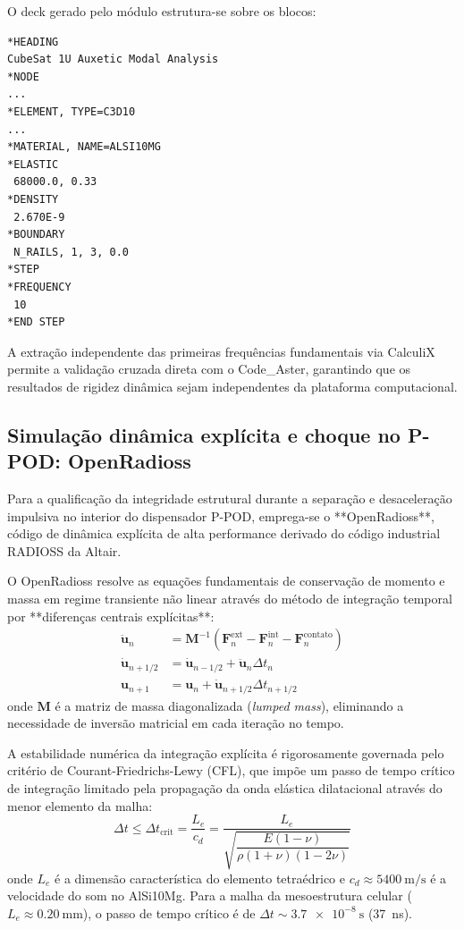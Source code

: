 O deck gerado pelo módulo  estrutura-se sobre os blocos:
\begin{verbatim}
*HEADING
CubeSat 1U Auxetic Modal Analysis
*NODE
...
*ELEMENT, TYPE=C3D10
...
*MATERIAL, NAME=ALSI10MG
*ELASTIC
 68000.0, 0.33
*DENSITY
 2.670E-9
*BOUNDARY
 N_RAILS, 1, 3, 0.0
*STEP
*FREQUENCY
 10
*END STEP
\end{verbatim}
A extração independente das primeiras frequências fundamentais via CalculiX permite a validação cruzada direta com o Code\_Aster, garantindo que os resultados de rigidez dinâmica sejam independentes da plataforma computacional.

\subsection{Simulação dinâmica explícita e choque no P-POD: OpenRadioss}
\label{subsec:openradioss-stack}

Para a qualificação da integridade estrutural durante a separação e desaceleração impulsiva no interior do dispensador P-POD, emprega-se o **OpenRadioss**, código de dinâmica explícita de alta performance derivado do código industrial RADIOSS da Altair.

O OpenRadioss resolve as equações fundamentais de conservação de momento e massa em regime transiente não linear através do método de integração temporal por **diferenças centrais explícitas**:
\begin{align}
  \ddot{\mathbf{u}}_n &= \mathbf{M}^{-1} \left( \mathbf{F}_n^{\text{ext}} - \mathbf{F}_n^{\text{int}} - \mathbf{F}_n^{\text{contato}} \right) \label{eq:radioss-acel} \\
  \dot{\mathbf{u}}_{n+1/2} &= \dot{\mathbf{u}}_{n-1/2} + \ddot{\mathbf{u}}_n \Delta t_n \label{eq:radioss-vel} \\
  \mathbf{u}_{n+1} &= \mathbf{u}_n + \dot{\mathbf{u}}_{n+1/2} \Delta t_{n+1/2} \label{eq:radioss-desloc}
\end{align}
onde $\mathbf{M}$ é a matriz de massa diagonalizada (\textit{lumped mass}), eliminando a necessidade de inversão matricial em cada iteração no tempo.

A estabilidade numérica da integração explícita é rigorosamente governada pelo critério de Courant-Friedrichs-Lewy (CFL), que impõe um passo de tempo crítico de integração limitado pela propagação da onda elástica dilatacional através do menor elemento da malha:
\begin{equation}
  \Delta t \le \Delta t_{\text{crit}} = \frac{L_e}{c_d} = \frac{L_e}{\sqrt{\dfrac{E(1-\nu)}{\rho(1+\nu)(1-2\nu)}}}
  \label{eq:cfl-teoria}
\end{equation}
onde $L_e$ é a dimensão característica do elemento tetraédrico e $c_d \approx \SI{5400}{\metre\per\second}$ é a velocidade do som no AlSi10Mg. Para a malha da mesoestrutura celular ($L_e \approx \SI{0.20}{\milli\metre}$), o passo de tempo crítico é de $\Delta t \sim \SI{3.7e-8}{\second}$ (\SI{37}{\nano\second}). 

